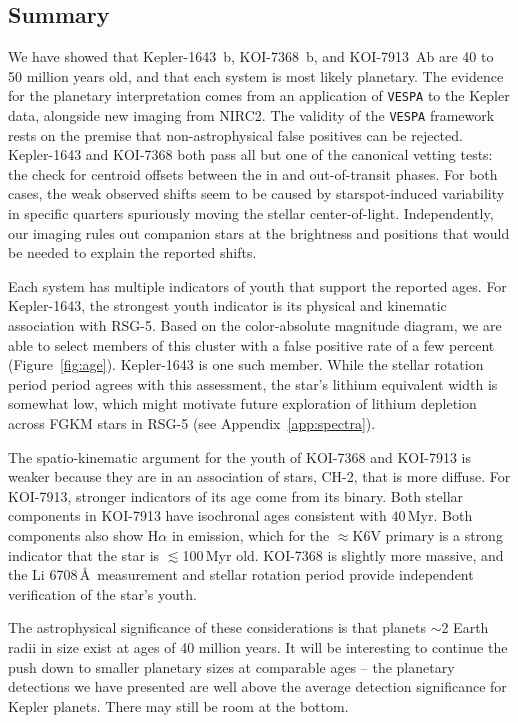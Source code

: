 \documentclass[12pt,twocolumn]{aastex63}
\begin{document}
\subsection{Summary}

We have showed that Kepler-1643~b, KOI-7368~b, and KOI-7913~Ab
are 40 to 50 million years old, and that each system
is most likely planetary.  The evidence for the planetary
interpretation comes from an application of \texttt{VESPA} to the
Kepler data, alongside new imaging from NIRC2.  The
validity of the \texttt{VESPA} framework rests on the premise that
non-astrophysical false positives can be rejected.  Kepler-1643 and
KOI-7368 both pass all but one of the canonical vetting tests: the
check for centroid offsets between the in and out-of-transit phases.
For both cases, the weak observed shifts seem to be
caused by starspot-induced variability in specific quarters
spuriously moving the stellar center-of-light.
Independently, our imaging rules out companion stars at the brightness
and positions that would be needed to explain the reported shifts.

Each system has multiple indicators of youth that support the
reported ages.  For Kepler-1643, the strongest youth indicator
is its physical and kinematic association with RSG-5.  Based on the
color-absolute magnitude diagram, we are able to select members
of this cluster with a false positive rate of a few percent
(Figure~\ref{fig:age}).  Kepler-1643 is one such member.  While the
stellar rotation period period agrees with this assessment, the star's
lithium equivalent width is somewhat low, which might motivate future
exploration of lithium depletion across FGKM stars in RSG-5 (see
Appendix~\ref{app:spectra}).

The spatio-kinematic argument for the youth of KOI-7368 and
KOI-7913 is weaker because they are in an association of stars, CH-2,
that is more diffuse.  For KOI-7913, stronger indicators of its age
come from its binary.  Both stellar components in KOI-7913
have isochronal ages consistent with $40$\,Myr.
Both components also show H$\alpha$ in emission, which for
the $\approx$K6V primary is a strong indicator that the star is
$\lesssim$100$\,$Myr old.  KOI-7368 is slightly more
massive, and the Li 6708\,\AA\ measurement and stellar rotation period
provide independent verification of the
star's youth.

The astrophysical significance of these considerations
is that planets $\sim$2 Earth radii in size exist at ages of 40 million years.
It will be interesting to continue the push down to smaller planetary
sizes at comparable ages -- the planetary detections we have
presented are well above the average detection significance for Kepler 
planets.  There may still be room at the bottom.
\end{document}
